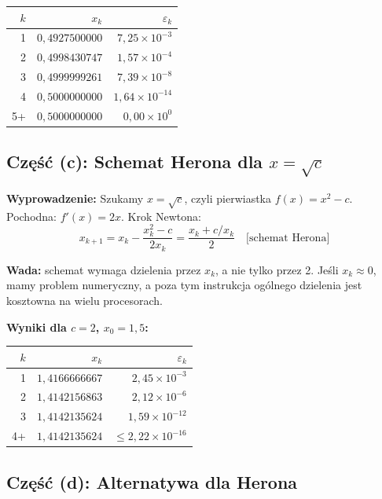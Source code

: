 \documentclass[12pt, a4paper]{article}
\begin{document}
\begin{center}
\begin{tabular}{r|r|r}
\toprule
$k$ & $x_k$ & $\varepsilon_k$ \\
\midrule
1 & $0{,}4927500000$ & $7{,}25 \times 10^{-3}$ \\
2 & $0{,}4998430747$ & $1{,}57 \times 10^{-4}$ \\
3 & $0{,}4999999261$ & $7{,}39 \times 10^{-8}$ \\
4 & $0{,}5000000000$ & $1{,}64 \times 10^{-14}$ \\
5+ & $0{,}5000000000$ & $0{,}00 \times 10^{0}$ \\
\bottomrule
\end{tabular}
\end{center}

\subsection{Część (c): Schemat Herona dla $x = \sqrt{c}$}

\textbf{Wyprowadzenie:} Szukamy $x = \sqrt{c}$, czyli pierwiastka $f(x) = x^2 - c$. Pochodna: $f'(x) = 2x$. Krok Newtona:
\[
  x_{k+1} = x_k - \frac{x_k^2 - c}{2x_k} = \frac{x_k + c/x_k}{2} \quad \text{[schemat Herona]}
\]

\textbf{Wada:} schemat wymaga dzielenia przez $x_k$, a nie tylko przez 2. Jeśli $x_k \approx 0$, mamy problem numeryczny, a poza tym instrukcja ogólnego dzielenia jest kosztowna na wielu procesorach.

\textbf{Wyniki dla $c = 2$, $x_0 = 1{,}5$:}

\begin{center}
\begin{tabular}{r|r|r}
\toprule
$k$ & $x_k$ & $\varepsilon_k$ \\
\midrule
1 & $1{,}4166666667$ & $2{,}45 \times 10^{-3}$ \\
2 & $1{,}4142156863$ & $2{,}12 \times 10^{-6}$ \\
3 & $1{,}4142135624$ & $1{,}59 \times 10^{-12}$ \\
4+ & $1{,}4142135624$ & $\leq 2{,}22 \times 10^{-16}$ \\
\bottomrule
\end{tabular}
\end{center}

\subsection{Część (d): Alternatywa dla Herona}
\end{document}
